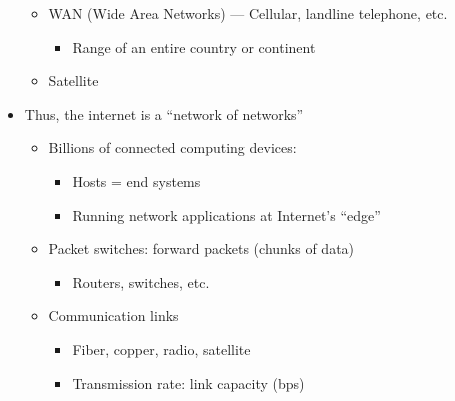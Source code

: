 \begin{itemize}
\begin{itemize}
\begin{itemize}
        \end{itemize}

      \item WAN (Wide Area Networks) — Cellular, landline telephone, etc.

        \begin{itemize}

          \item Range of an entire country or continent

        \end{itemize}

      \item Satellite

    \end{itemize}

  \item Thus, the internet is a ``network of networks''

    \begin{itemize}

      \item Billions of connected computing devices:

        \begin{itemize}

          \item Hosts = end systems

          \item Running network applications at Internet's ``edge''

        \end{itemize}

      \item Packet switches: forward packets (chunks of data)

          \begin{itemize}

            \item Routers, switches, etc.

          \end{itemize}

        \item Communication links

          \begin{itemize}

            \item Fiber, copper, radio, satellite

            \item Transmission rate: link capacity (bps)


\end{itemize}
\end{itemize}
\end{itemize}
